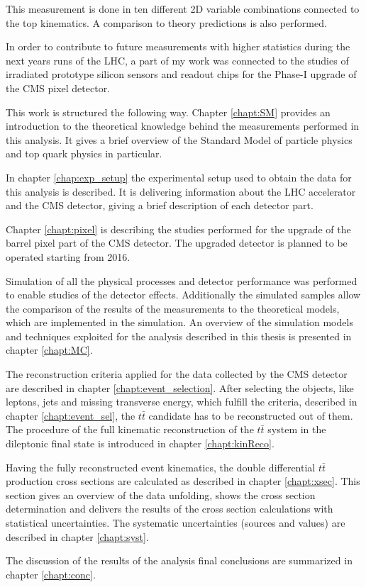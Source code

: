 This measurement is done in ten different 2D variable combinations
connected to the top kinematics. A comparison to theory predictions is also performed.

In order to contribute to future measurements with higher statistics during
the next years runs of the LHC, a part of my work was connected to the studies of irradiated
prototype silicon sensors and readout chips for the Phase-I upgrade of the CMS pixel detector.

This work is structured the following way. Chapter \ref{chapt:SM} provides an introduction to the theoretical
knowledge behind the measurements performed in this analysis. It gives a brief overview of the Standard
Model of particle physics and top quark physics in particular.

In chapter \ref{chap:exp_setup} the experimental setup used to obtain the data for this analysis is described.
It is delivering information about the LHC accelerator and the CMS detector, giving a brief description of each detector part.

Chapter \ref{chapt:pixel} is describing the studies performed for the
upgrade of the barrel pixel part of the CMS detector. The upgraded detector is planned to be operated starting from 2016.

Simulation of all the physical processes and detector performance was performed to enable studies of the detector effects.
Additionally the simulated samples allow the comparison of the results of the measurements to the theoretical models, 
which are implemented in the simulation. An overview of the simulation
models and techniques exploited for the analysis described in this thesis is presented in chapter \ref{chapt:MC}.

The reconstruction criteria applied for the data collected by the CMS detector are described
in chapter \ref{chapt:event_selection}. After selecting the objects, like leptons, jets and missing transverse energy, which 
fulfill the criteria, described in chapter \ref{chapt:event_sel}, the $t\bar{t}$ candidate has to be reconstructed out
of them. The procedure of the full kinematic reconstruction of the $t\bar{t}$ system in the dileptonic final state is introduced
in chapter \ref{chapt:kinReco}.

Having the fully reconstructed event kinematics, the double differential $t\bar{t}$ production cross sections are calculated
as described in chapter \ref{chapt:xsec}. This section gives an overview of the data unfolding, shows the cross section determination 
and delivers the results of the cross section calculations with statistical uncertainties. The systematic uncertainties (sources and 
values) are described in chapter \ref{chapt:syst}.

The discussion of the results of the analysis final conclusions are summarized in chapter \ref{chapt:conc}.